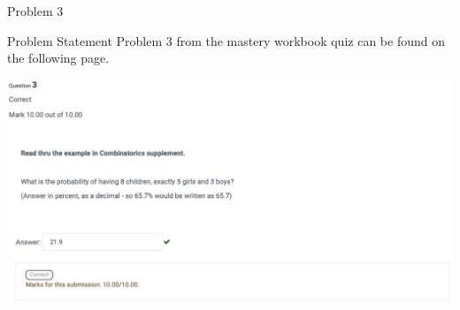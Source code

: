 \begin{problem}{Problem 3}
    \begin{statement}{Problem Statement}
        Problem 3 from the mastery workbook quiz can be found on the following page.
    \end{statement}
    \begin{highlight}[Solution]
        \begin{center}
            \includegraphics[width = 1.0\textwidth]{Images/Problem 3.png}
        \end{center}
    \end{highlight}
\end{problem}

